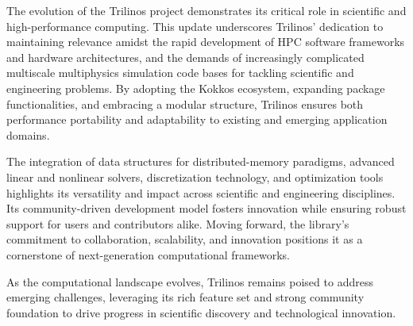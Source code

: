 
The evolution of the Trilinos project demonstrates its critical role in scientific and high-performance computing.
This update underscores Trilinos' dedication to maintaining relevance amidst the rapid development of HPC software frameworks and hardware architectures, and the demands of increasingly complicated multiscale multiphysics simulation code bases for tackling scientific and engineering problems.
By adopting the Kokkos ecosystem, expanding package functionalities, and embracing a modular structure,
Trilinos ensures both performance portability and adaptability to existing and emerging application domains.

The integration of data structures for distributed-memory paradigms, advanced linear and nonlinear solvers, discretization technology, and optimization tools highlights its versatility and impact across scientific and engineering disciplines.
Its community-driven development model fosters innovation while ensuring robust support for users and contributors alike.
Moving forward, the library's commitment to collaboration, scalability, and innovation positions it as a cornerstone of next-generation computational frameworks.

As the computational landscape evolves, Trilinos remains poised to address emerging challenges, leveraging its rich feature set and strong community foundation to drive progress in scientific discovery and technological innovation.